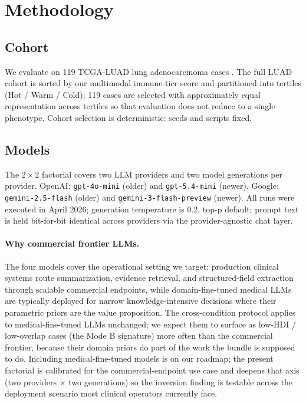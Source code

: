 \documentclass{article}
\theoremstyle{plain}
\begin{document}
\section{Methodology}
\label{sec:methods}

\subsection{Cohort}
We evaluate on 119 TCGA-LUAD lung adenocarcinoma cases \citep{collisson2014comprehensive}. The full LUAD cohort is sorted by our multimodal immune-tier score and partitioned into tertiles (Hot / Warm / Cold); 119 cases are selected with approximately equal representation across tertiles so that evaluation does not reduce to a single phenotype. Cohort selection is deterministic: seeds and scripts fixed.

\subsection{Models}
The 2\,$\times$\,2 factorial covers two LLM providers and two model generations per provider. OpenAI: \texttt{gpt-4o-mini} (older) and \texttt{gpt-5.4-mini} (newer). Google: \texttt{gemini-2.5-flash} (older) and \texttt{gemini-3-flash-preview} (newer). All runs were executed in April 2026; generation temperature is 0.2, top-p default; prompt text is held bit-for-bit identical across providers via the provider-agnostic chat layer.

\paragraph{Why commercial frontier LLMs.}
The four models cover the operational setting we target: production clinical systems route summarization, evidence retrieval, and structured-field extraction through scalable commercial endpoints, while domain-fine-tuned medical LLMs are typically deployed for narrow knowledge-intensive decisions where their parametric priors are the value proposition. The cross-condition protocol applies to medical-fine-tuned LLMs unchanged; we expect them to surface as low-HDI / low-overlap cases (the Mode B signature) more often than the commercial frontier, because their domain priors do part of the work the bundle is supposed to do. Including medical-fine-tuned models is on our roadmap; the present factorial is calibrated for the commercial-endpoint use case and deepens that axis (two providers $\times$ two generations) so the inversion finding is testable across the deployment scenario most clinical operators currently face.
\end{document}
